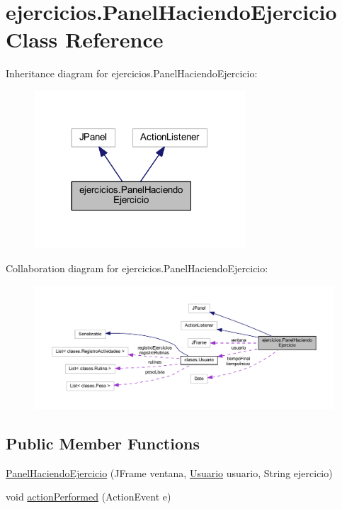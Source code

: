 \hypertarget{classejercicios_1_1_panel_haciendo_ejercicio}{}\section{ejercicios.\+Panel\+Haciendo\+Ejercicio Class Reference}
\label{classejercicios_1_1_panel_haciendo_ejercicio}


Inheritance diagram for ejercicios.\+Panel\+Haciendo\+Ejercicio\+:
\nopagebreak
\begin{figure}[H]
\begin{center}
\leavevmode
\includegraphics[width=224pt]{classejercicios_1_1_panel_haciendo_ejercicio__inherit__graph}
\end{center}
\end{figure}


Collaboration diagram for ejercicios.\+Panel\+Haciendo\+Ejercicio\+:
\nopagebreak
\begin{figure}[H]
\begin{center}
\leavevmode
\includegraphics[width=350pt]{classejercicios_1_1_panel_haciendo_ejercicio__coll__graph}
\end{center}
\end{figure}
\subsection*{Public Member Functions}
\begin{DoxyCompactItemize}
\item 
\mbox{\hyperlink{classejercicios_1_1_panel_haciendo_ejercicio_a3a1ba6fb4deba12a0df086c267a76771}{Panel\+Haciendo\+Ejercicio}} (J\+Frame ventana, \mbox{\hyperlink{classclases_1_1_usuario}{Usuario}} usuario, String ejercicio)
\item 
void \mbox{\hyperlink{classejercicios_1_1_panel_haciendo_ejercicio_aa0893659c42df3f0e7d0a1cede41846c}{action\+Performed}} (Action\+Event e)
\end{DoxyCompactItemize}


